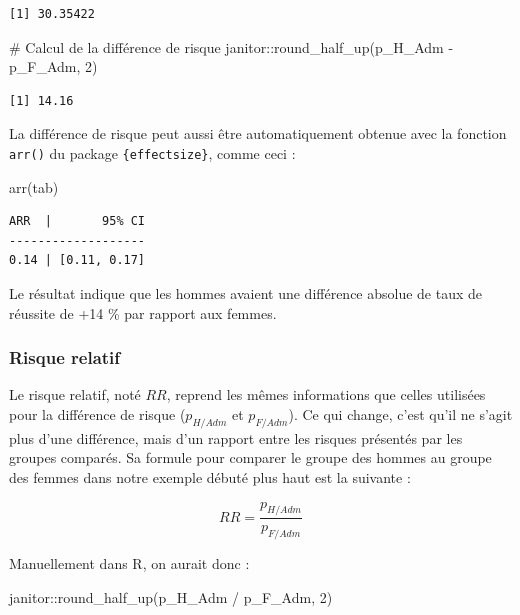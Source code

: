 \documentclass[
  letterpaper,
]{book}
\newenvironment{Shaded}{\begin{snugshade}}{\end{snugshade}}
\newcommand{\CommentTok}[1]{\textcolor[rgb]{0.37,0.37,0.37}{#1}}
\newcommand{\DecValTok}[1]{\textcolor[rgb]{0.68,0.00,0.00}{#1}}
\newcommand{\FunctionTok}[1]{\textcolor[rgb]{0.28,0.35,0.67}{#1}}
\newcommand{\NormalTok}[1]{\textcolor[rgb]{0.00,0.23,0.31}{#1}}
\newcommand{\SpecialCharTok}[1]{\textcolor[rgb]{0.37,0.37,0.37}{#1}}
\begin{document}
\begin{verbatim}
[1] 30.35422
\end{verbatim}

\begin{Shaded}
\begin{Highlighting}[]
\CommentTok{\# Calcul de la différence de risque}
\NormalTok{janitor}\SpecialCharTok{::}\FunctionTok{round\_half\_up}\NormalTok{(p\_H\_Adm }\SpecialCharTok{{-}}\NormalTok{ p\_F\_Adm, }\DecValTok{2}\NormalTok{)}
\end{Highlighting}
\end{Shaded}

\begin{verbatim}
[1] 14.16
\end{verbatim}

La différence de risque peut aussi être automatiquement obtenue avec la
fonction \texttt{arr()} du package \texttt{\{effectsize\}}, comme ceci :

\begin{Shaded}
\begin{Highlighting}[]
\FunctionTok{arr}\NormalTok{(tab)}
\end{Highlighting}
\end{Shaded}

\begin{verbatim}
ARR  |       95% CI
-------------------
0.14 | [0.11, 0.17]
\end{verbatim}

Le résultat indique que les hommes avaient une différence absolue de
taux de réussite de +14 \% par rapport aux femmes.

\subsubsection{Risque relatif}\label{risque-relatif}

Le risque relatif, noté \(RR\), reprend les mêmes informations que
celles utilisées pour la différence de risque (\(p_{H/Adm}\) et
\(p_{F/Adm}\)). Ce qui change, c'est qu'il ne s'agit plus d'une
différence, mais d'un rapport entre les risques présentés par les
groupes comparés. Sa formule pour comparer le groupe des hommes au
groupe des femmes dans notre exemple débuté plus haut est la suivante :

\[RR = \frac{{p_{H/Adm}}}{{p_{F/Adm}}}\]

Manuellement dans R, on aurait donc :

\begin{Shaded}
\begin{Highlighting}[]
\NormalTok{janitor}\SpecialCharTok{::}\FunctionTok{round\_half\_up}\NormalTok{(p\_H\_Adm }\SpecialCharTok{/}\NormalTok{ p\_F\_Adm, }\DecValTok{2}\NormalTok{)}
\end{Highlighting}
\end{Shaded}
\end{document}
